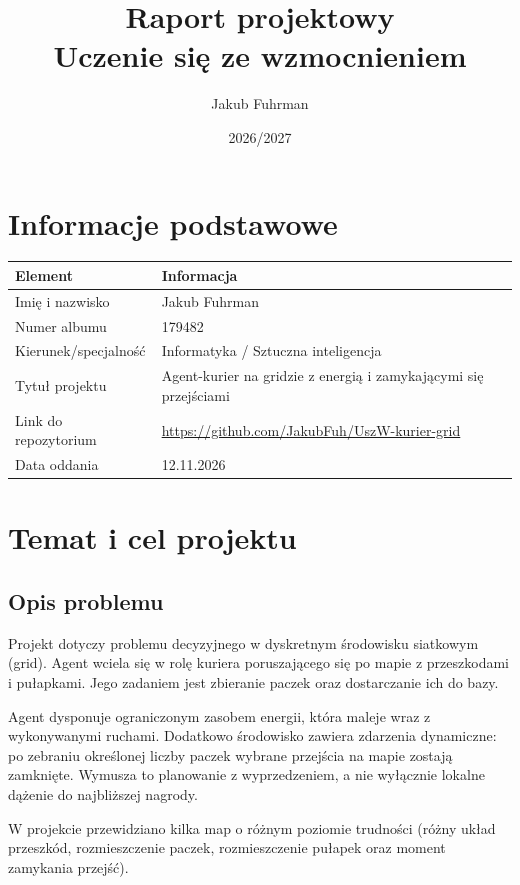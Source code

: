 \documentclass[12pt]{article}
\title{Raport projektowy\\Uczenie się ze wzmocnieniem}
\author{Jakub Fuhrman}
\date{2026/2027}
\begin{document}
\maketitle
\tableofcontents
\newpage

\section{Informacje podstawowe}

\begin{center}
\begin{tabular}{p{}p{}}
\toprule
Element & Informacja \\
\midrule
Imię i nazwisko & Jakub Fuhrman \\
Numer albumu & 179482 \\
Kierunek/specjalność & Informatyka / Sztuczna inteligencja \\
Tytuł projektu & Agent-kurier na gridzie z energią i zamykającymi się przejściami \\
Link do repozytorium & \url{https://github.com/JakubFuh/UszW-kurier-grid} \\
Data oddania & 12.11.2026 \\
\bottomrule
\end{tabular}
\end{center}

\section{Temat i cel projektu}

\subsection{Opis problemu}

Projekt dotyczy problemu decyzyjnego w dyskretnym środowisku siatkowym (grid).
Agent wciela się w rolę kuriera poruszającego się po mapie z przeszkodami i pułapkami.
Jego zadaniem jest zbieranie paczek oraz dostarczanie ich do bazy.

Agent dysponuje ograniczonym zasobem energii, która maleje wraz z wykonywanymi ruchami.
Dodatkowo środowisko zawiera zdarzenia dynamiczne: po zebraniu określonej liczby paczek
wybrane przejścia na mapie zostają zamknięte. Wymusza to planowanie z wyprzedzeniem,
a nie wyłącznie lokalne dążenie do najbliższej nagrody.

W projekcie przewidziano kilka map o różnym poziomie trudności
(różny układ przeszkód, rozmieszczenie paczek, rozmieszczenie pułapek oraz moment zamykania przejść).
\end{document}
